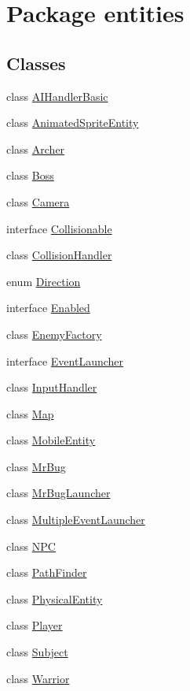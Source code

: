\hypertarget{namespaceentities}{}\section{Package entities}
\label{namespaceentities}
\subsection*{Classes}
\begin{DoxyCompactItemize}
\item 
class \mbox{\hyperlink{classentities_1_1_a_i_handler_basic}{A\+I\+Handler\+Basic}}
\item 
class \mbox{\hyperlink{classentities_1_1_animated_sprite_entity}{Animated\+Sprite\+Entity}}
\item 
class \mbox{\hyperlink{classentities_1_1_archer}{Archer}}
\item 
class \mbox{\hyperlink{classentities_1_1_boss}{Boss}}
\item 
class \mbox{\hyperlink{classentities_1_1_camera}{Camera}}
\item 
interface \mbox{\hyperlink{interfaceentities_1_1_collisionable}{Collisionable}}
\item 
class \mbox{\hyperlink{classentities_1_1_collision_handler}{Collision\+Handler}}
\item 
enum \mbox{\hyperlink{enumentities_1_1_direction}{Direction}}
\item 
interface \mbox{\hyperlink{interfaceentities_1_1_enabled}{Enabled}}
\item 
class \mbox{\hyperlink{classentities_1_1_enemy_factory}{Enemy\+Factory}}
\item 
interface \mbox{\hyperlink{interfaceentities_1_1_event_launcher}{Event\+Launcher}}
\item 
class \mbox{\hyperlink{classentities_1_1_input_handler}{Input\+Handler}}
\item 
class \mbox{\hyperlink{classentities_1_1_map}{Map}}
\item 
class \mbox{\hyperlink{classentities_1_1_mobile_entity}{Mobile\+Entity}}
\item 
class \mbox{\hyperlink{classentities_1_1_mr_bug}{Mr\+Bug}}
\item 
class \mbox{\hyperlink{classentities_1_1_mr_bug_launcher}{Mr\+Bug\+Launcher}}
\item 
class \mbox{\hyperlink{classentities_1_1_multiple_event_launcher}{Multiple\+Event\+Launcher}}
\item 
class \mbox{\hyperlink{classentities_1_1_n_p_c}{N\+PC}}
\item 
class \mbox{\hyperlink{classentities_1_1_path_finder}{Path\+Finder}}
\item 
class \mbox{\hyperlink{classentities_1_1_physical_entity}{Physical\+Entity}}
\item 
class \mbox{\hyperlink{classentities_1_1_player}{Player}}
\item 
class \mbox{\hyperlink{classentities_1_1_subject}{Subject}}
\item 
class \mbox{\hyperlink{classentities_1_1_warrior}{Warrior}}
\end{DoxyCompactItemize}



